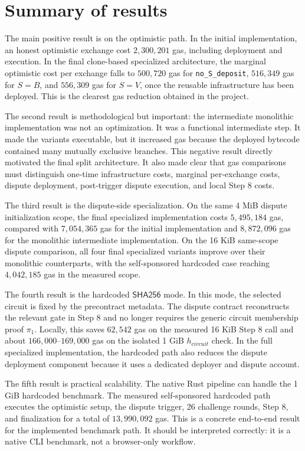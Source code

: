 \section{Summary of results}

The main positive result is on the optimistic path. In the initial implementation, an
honest optimistic exchange cost \(2,300,201\) gas, including deployment and execution. In
the final clone-based specialized architecture, the marginal optimistic cost per exchange
falls to \(500,720\) gas for \texttt{no\_S\_deposit}, \(516,349\) gas for \(S=B\), and
\(556,309\) gas for \(S=V\), once the reusable infrastructure has been deployed. This is the
clearest gas reduction obtained in the project.

The second result is methodological but important: the intermediate monolithic implementation
was not an optimization. It was a functional intermediate step. It made the variants
executable, but it increased gas because the deployed bytecode contained many mutually
exclusive branches. This negative result directly motivated the final split architecture.
It also made clear that gas comparisons must distinguish one-time infrastructure costs,
marginal per-exchange costs, dispute deployment, post-trigger dispute execution, and local
Step 8 costs.

The third result is the dispute-side specialization. On the same 4 MiB dispute
initialization scope, the final specialized implementation costs \(5,495,184\) gas, compared
with \(7,054,365\) gas for the initial implementation and \(8,872,096\) gas for the
monolithic intermediate implementation. On the 16 KiB same-scope dispute comparison, all
four final specialized variants improve over their monolithic counterparts, with the
self-sponsored hardcoded case reaching \(4,042,185\) gas in the measured scope.

The fourth result is the hardcoded \(\mathsf{SHA256}\) mode. In this mode, the selected
circuit is fixed by the precontract metadata. The dispute contract reconstructs the
relevant gate in Step 8 and no longer requires the generic circuit membership proof
\(\pi_1\). Locally, this saves \(62,542\) gas on the measured 16 KiB Step 8 call and about
\(166,000\)--\(169,000\) gas on the isolated 1 GiB \(h_{\mathit{circuit}}\) check. In the
full specialized implementation, the hardcoded path also reduces the dispute deployment
component because it uses a dedicated deployer and dispute account.

The fifth result is practical scalability. The native Rust pipeline can handle the 1 GiB
hardcoded benchmark. The measured self-sponsored hardcoded path executes the optimistic
setup, the dispute trigger, 26 challenge rounds, Step 8, and finalization for a total of
\(13,990,092\) gas. This is a concrete end-to-end result for the implemented benchmark
path. It should be interpreted correctly: it is a native CLI benchmark, not a
browser-only workflow.

